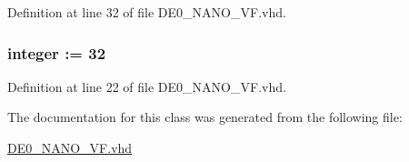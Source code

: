 Definition at line 32 of file D\+E0\+\_\+\+N\+A\+N\+O\+\_\+\+V\+F.\+vhd.

\hypertarget{class_d_e0___n_a_n_o___v_f_a9aab84a644aefaf58d2d687a1b235ff3}{}
\subsubsection[{T\+A\+M\+\_\+\+M\+E\+M}]{ {\bfseries \textcolor{vhdlchar}{ }} {\bfseries \textcolor{comment}{integer}\textcolor{vhdlchar}{ }\textcolor{vhdlchar}{ }\textcolor{vhdlchar}{\+:}\textcolor{vhdlchar}{=}\textcolor{vhdlchar}{ }\textcolor{vhdlchar}{ } \textcolor{vhdldigit}{32} \textcolor{vhdlchar}{ }} \hspace{0.3cm}{\ttfamily [Generic]}}\label{class_d_e0___n_a_n_o___v_f_a9aab84a644aefaf58d2d687a1b235ff3}


Definition at line 22 of file D\+E0\+\_\+\+N\+A\+N\+O\+\_\+\+V\+F.\+vhd.



The documentation for this class was generated from the following file\+:\begin{DoxyCompactItemize}
\item 
\hyperlink{_d_e0___n_a_n_o___v_f_8vhd}{D\+E0\+\_\+\+N\+A\+N\+O\+\_\+\+V\+F.\+vhd}\end{DoxyCompactItemize}
